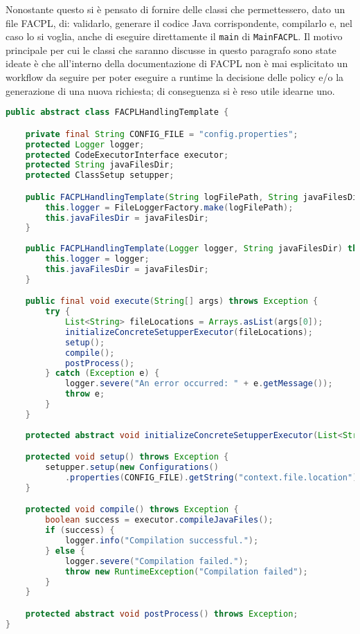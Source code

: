 Nonostante questo si è pensato di fornire delle classi che permettessero, dato un file FACPL, di: validarlo, generare il codice Java corrispondente, compilarlo e, nel caso lo si voglia, anche di eseguire direttamente il \texttt{main} di \texttt{MainFACPL}. Il motivo principale per cui le classi che saranno discusse in questo paragrafo sono state ideate è che all'interno della documentazione di FACPL non è mai esplicitato un workflow da seguire per poter eseguire a runtime la decisione delle policy e/o la generazione di una nuova richiesta; di conseguenza si è reso utile idearne uno.
\begin{lstlisting}[language=Java, caption=Classe FACPLHandlingTemplate, label=code:FACPLHandlingTemplate, basicstyle=\fontsize{8.5}{10}\ttfamily]
public abstract class FACPLHandlingTemplate {

	private final String CONFIG_FILE = "config.properties";
    protected Logger logger;
    protected CodeExecutorInterface executor;
    protected String javaFilesDir;
    protected ClassSetup setupper;

    public FACPLHandlingTemplate(String logFilePath, String javaFilesDir) throws IOException {
        this.logger = FileLoggerFactory.make(logFilePath);
        this.javaFilesDir = javaFilesDir;
    }
    
    public FACPLHandlingTemplate(Logger logger, String javaFilesDir) throws IOException {
        this.logger = logger;
        this.javaFilesDir = javaFilesDir;
    }

    public final void execute(String[] args) throws Exception {
        try {
            List<String> fileLocations = Arrays.asList(args[0]);
            initializeConcreteSetupperExecutor(fileLocations);
            setup();
            compile();
            postProcess();
        } catch (Exception e) {
            logger.severe("An error occurred: " + e.getMessage());
            throw e;
        }
    }
    
    protected abstract void initializeConcreteSetupperExecutor(List<String> fileLocations) throws Exception;

    protected void setup() throws Exception {
        setupper.setup(new Configurations()
            .properties(CONFIG_FILE).getString("context.file.location"), javaFilesDir);
    }

    protected void compile() throws Exception {
        boolean success = executor.compileJavaFiles();
        if (success) {
            logger.info("Compilation successful.");
        } else {
            logger.severe("Compilation failed.");
            throw new RuntimeException("Compilation failed");
        }
    }

    protected abstract void postProcess() throws Exception;
}
\end{lstlisting}
